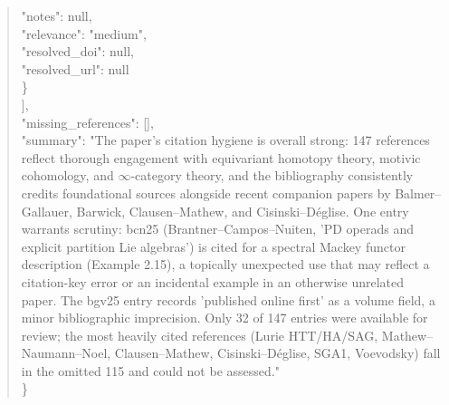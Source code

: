 \documentclass[11pt]{article}
\begin{document}
\begin{quote}
      "notes": null,\\
      "relevance": "medium",\\
      "resolved\_doi": null,\\
      "resolved\_url": null\\
    \}\\
  ],\\
  "missing\_references": [],\\
  "summary": "The paper's citation hygiene is overall strong: 147 references reflect thorough engagement with equivariant homotopy theory, motivic cohomology, and \ensuremath{\infty}-category theory, and the bibliography consistently credits foundational sources alongside recent companion papers by Balmer--Gallauer, Barwick, Clausen--Mathew, and Cisinski--Déglise. One entry warrants scrutiny: bcn25 (Brantner--Campos--Nuiten, 'PD operads and explicit partition Lie algebras') is cited for a spectral Mackey functor description (Example 2.15), a topically unexpected use that may reflect a citation-key error or an incidental example in an otherwise unrelated paper. The bgv25 entry records 'published online first' as a volume field, a minor bibliographic imprecision. Only 32 of 147 entries were available for review; the most heavily cited references (Lurie HTT/HA/SAG, Mathew--Naumann--Noel, Clausen--Mathew, Cisinski--Déglise, SGA1, Voevodsky) fall in the omitted 115 and could not be assessed."\\
\}\\
\end{quote}
\end{document}
